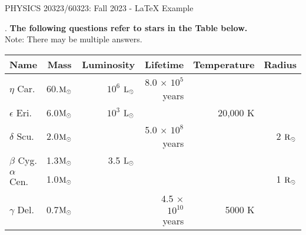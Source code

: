 \documentclass[12pt]{article}
\begin{document}
\def\pos{\medskip\quad}
\def\subpos{\smallskip \qquad}


\begin{center}
{\large
PHYSICS 20323/60323: Fall 2023 - LaTeX Example
}\\
\end{center}


\vskip0.05in
. {\bf The following questions refer to stars in the Table below.} \\
Note: There may be multiple answers.


\vskip0.15in
\begin{tabular}{|l|c|r|r|r|r|}\hline
Name & Mass & Luminosity & Lifetime & Temperature & Radius \\\hline

$\eta$ Car. & 60.\(\textup{M}_\odot\) & $10^6$ \(\textup{L}_\odot\) & 8.0 $\times$ $10^5$ years &  & \\\hline

$\epsilon$ Eri. & 6.0\(\textup{M}_\odot\) & $10^3$ \(\textup{L}_\odot\) &  & 20,000 K & \\\hline

$\delta$ Scu. & 2.0\(\textup{M}_\odot\) & & 5.0 $\times$ $10^8$ years & & 2 \(\textup{R}_\odot\) \\\hline

$\beta$ Cyg. & 1.3\(\textup{M}_\odot\) & 3.5 \(\textup{L}_\odot\) & & & \\\hline

$\alpha$ Cen. & 1.0\(\textup{M}_\odot\) & & & & 1 \(\textup{R}_\odot\) \\\hline

$\gamma$ Del. & 0.7\(\textup{M}_\odot\) & & 4.5 $\times$ $10^{10}$ years & 5000 K & \\\hline
\end{tabular}
\end{document}
